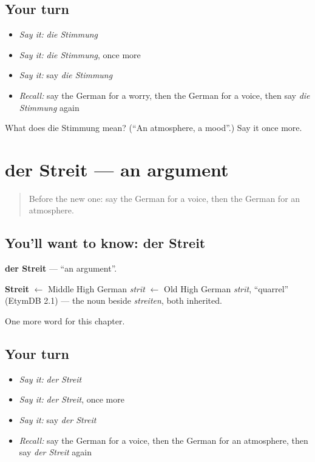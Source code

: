 \subsection*{Your turn}
\begin{itemize}
\raggedright
  \item \emph{Say it:} \emph{die Stimmung}
  \item \emph{Say it:} \emph{die Stimmung}, once more
  \item \emph{Say it:} say \emph{die Stimmung}
  \item \emph{Recall:} say the German for a worry, then the German for a voice, then say \emph{die Stimmung} again
\end{itemize}

\begin{tcolorbox}[breakable,colback=teal!4,colframe=teal!35!black,title={Before you move on}]
What does die Stimmung mean? (\textquotedblleft{}An atmosphere, a mood\textquotedblright{}.) Say it once more.
\end{tcolorbox}
\section[der Streit]{der Streit — an argument}

\label{lesson:GE-C239-streit}



\begin{quote}
Before the new one: say the German for a voice, then the German for an atmosphere.
\end{quote}

\subsection*{You'll want to know: der Streit}
\textbf{der Streit} — \textquotedblleft{}an argument\textquotedblright{}.

\begin{cousinweb}
\textbf{Streit} $\leftarrow$ Middle High German \emph{strīt} $\leftarrow$ Old High German \emph{strīt}, \textquotedblleft{}quarrel\textquotedblright{} (EtymDB 2.1) — the noun beside \emph{streiten}, both inherited.
\end{cousinweb}

\begin{grammarlens}[title={What you've built}]
One more word for this chapter.
\end{grammarlens}

\subsection*{Your turn}
\begin{itemize}
\raggedright
  \item \emph{Say it:} \emph{der Streit}
  \item \emph{Say it:} \emph{der Streit}, once more
  \item \emph{Say it:} say \emph{der Streit}
  \item \emph{Recall:} say the German for a voice, then the German for an atmosphere, then say \emph{der Streit} again
\end{itemize}

